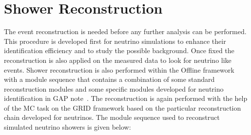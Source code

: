 \section{Shower Reconstruction}
\label{sec:reco}

The event reconstruction is needed before any further analysis can be performed. This procedure is developed first for neutrino simulations to enhance their identification efficiency and to study the possible background. Once fixed the reconstruction is also applied on the measured data to look for neutrino like events. Shower reconstruction is also performed within the Offline framework with a module sequence that contains a combination of some standard reconstruction modules and some specific modules developed for neutrino identification in GAP note~\cite{gap_note_2013}. The reconstruction is again performed with the help of the MC task on the GRID framework based on the particular reconstruction chain developed for neutrinos. The module sequence used to reconstruct simulated neutrino showers is given below:

